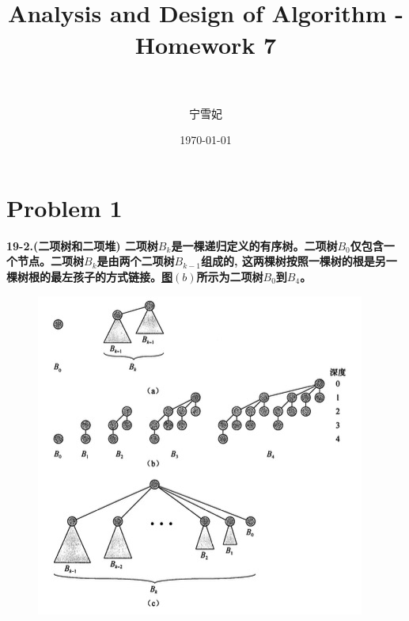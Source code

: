 \documentclass[paper=a4, fontsize=11pt]{scrartcl} %
\title{	
\normalfont \normalsize 
\horrule{0.5pt} \\[0.4cm] %
\huge Analysis and Design of Algorithm - Homework 7\\ %
\horrule{2pt} \\[0.5cm] %
}
\author{宁雪妃} %
\date{\normalsize\today} %
\numberwithin{equation}{section} %
\numberwithin{figure}{section} %
\numberwithin{table}{section} %
\begin{document}
\maketitle %

\section{Problem 1}
\textbf{19-2.(二项树和二项堆) 二项树$B_k$是一棵递归定义的有序树。二项树$B_0$仅包含一个节点。二项树$B_k$是由两个二项树$B_{k-1}$组成的, 这两棵树按照一棵树的根是另一棵树根的最左孩子的方式链接。\hyperref[fig:1]{图$(b)$}所示为二项树$B_0$到$B_4$。}
  \begin{figure}
    \centering
    \includegraphics[height=32ex]{1}
    \label{fig:1}
  \end{figure}
  
\end{document}
